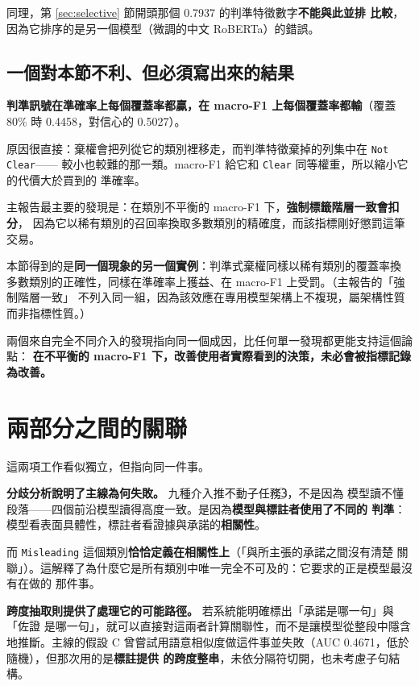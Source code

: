 \documentclass[11pt,a4paper]{ctexart}
\newcommand{\fn}[1]{\texttt{#1}}
\begin{document}
\medskip
同理，第 \ref{sec:selective} 節開頭那個 0.7937 的判準特徵數字\textbf{不能與此並排
比較}，因為它排序的是另一個模型（微調的中文 RoBERTa）的錯誤。

\subsection{一個對本節不利、但必須寫出來的結果}

\textbf{判準訊號在準確率上每個覆蓋率都贏，在 macro-F1 上每個覆蓋率都輸}（覆蓋 80\% 時
0.4458，對信心的 0.5027）。

原因很直接：棄權會把列從它的類別裡移走，而判準特徵棄掉的列集中在 \fn{Not Clear}——
較小也較難的那一類。macro-F1 給它和 \fn{Clear} 同等權重，所以縮小它的代價大於買到的
準確率。

\begin{tcolorbox}[colback=gray!8, colframe=gray!55, title=兩個獨立發現，同一個成因]
主報告最主要的發現是：在類別不平衡的 macro-F1 下，\textbf{強制標籤階層一致會扣分}，
因為它以稀有類別的召回率換取多數類別的精確度，而該指標剛好懲罰這筆交易。

\medskip
本節得到的是\textbf{同一個現象的另一個實例}：判準式棄權同樣以稀有類別的覆蓋率換
多數類別的正確性，同樣在準確率上獲益、在 macro-F1 上受罰。（主報告的「強制階層一致」
不列入同一組，因為該效應在專用模型架構上不複現，屬架構性質而非指標性質。）

\medskip
兩個來自完全不同介入的發現指向同一個成因，比任何單一發現都更能支持這個論點：
\textbf{在不平衡的 macro-F1 下，改善使用者實際看到的決策，未必會被指標記錄為改善。}
\end{tcolorbox}

\section{兩部分之間的關聯}

這兩項工作看似獨立，但指向同一件事。

\textbf{分歧分析說明了主線為何失敗。} 九種介入推不動子任務\textcircled{3}，不是因為
模型讀不懂段落——四個前沿模型讀得高度一致。是因為\textbf{模型與標註者使用了不同的
判準}：模型看表面具體性，標註者看證據與承諾的\textbf{相關性}。

而 \fn{Misleading} 這個類別\textbf{恰恰定義在相關性上}（「與所主張的承諾之間沒有清楚
關聯」）。這解釋了為什麼它是所有類別中唯一完全不可及的：它要求的正是模型最沒有在做的
那件事。

\textbf{跨度抽取則提供了處理它的可能路徑。} 若系統能明確標出「承諾是哪一句」與「佐證
是哪一句」，就可以直接對這兩者計算關聯性，而不是讓模型從整段中隱含地推斷。主線的假設 C
曾嘗試用語意相似度做這件事並失敗（AUC 0.4671，低於隨機），但那次用的是\textbf{標註提供
的跨度整串}，未依分隔符切開，也未考慮子句結構。
\end{document}
